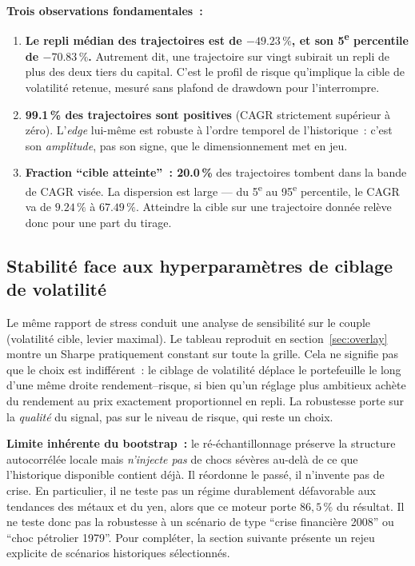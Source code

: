 \begin{insightbox}
\textbf{Trois observations fondamentales~:}
\begin{enumerate}
\item \textbf{Le repli médian des trajectoires est de $-49.23\,\%$, et son 5\textsuperscript{e} percentile de $-70.83\,\%$.} Autrement dit, une trajectoire sur vingt subirait un repli de plus des deux tiers du capital. C'est le profil de risque qu'implique la cible de volatilité retenue, mesuré sans plafond de drawdown pour l'interrompre.
\item \textbf{99.1\,\% des trajectoires sont positives} (CAGR strictement supérieur à zéro). L'\emph{edge} lui-même est robuste à l'ordre temporel de l'historique~: c'est son \emph{amplitude}, pas son signe, que le dimensionnement met en jeu.
\item \textbf{Fraction \enquote{cible atteinte}~: 20.0\,\%} des trajectoires tombent dans la bande de CAGR visée. La dispersion est large --- du 5\textsuperscript{e} au 95\textsuperscript{e} percentile, le CAGR va de $9.24\,\%$ à $67.49\,\%$. Atteindre la cible sur une trajectoire donnée relève donc pour une part du tirage.
\end{enumerate}
\end{insightbox}

\subsection{Stabilité face aux hyperparamètres de ciblage de volatilité}

Le même rapport de stress conduit une analyse de sensibilité sur le couple (volatilité cible, levier maximal). Le tableau reproduit en section~\ref{sec:overlay} montre un Sharpe pratiquement constant sur toute la grille. Cela ne signifie pas que le choix est indifférent~: le ciblage de volatilité déplace le portefeuille le long d'une même droite rendement--risque, si bien qu'un réglage plus ambitieux achète du rendement au prix exactement proportionnel en repli. La robustesse porte sur la \emph{qualité} du signal, pas sur le niveau de risque, qui reste un choix.

\begin{warningbox}
\textbf{Limite inhérente du bootstrap~:} le ré-échantillonnage préserve la structure autocorrélée locale mais \emph{n'injecte pas} de chocs sévères au-delà de ce que l'historique disponible contient déjà. Il réordonne le passé, il n'invente pas de crise. En particulier, il ne teste pas un régime durablement défavorable aux tendances des métaux et du yen, alors que ce moteur porte $86{,}5\,\%$ du résultat. Il ne teste donc pas la robustesse à un scénario de type \enquote{crise financière 2008} ou \enquote{choc pétrolier 1979}. Pour compléter, la section suivante présente un rejeu explicite de scénarios historiques sélectionnés.
\end{warningbox}

